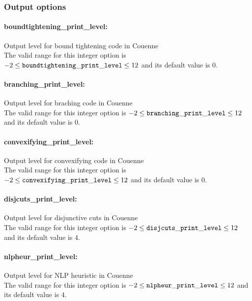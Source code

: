 \subsubsection{Output options}

\paragraph{boundtightening\_print\_level:}\label{sec:boundtightening_print_level} Output level for bound tightening code in Couenne $\;$ \\
 The valid range for this integer option is
$-2 \le {\tt boundtightening\_print\_level } \le 12$
and its default value is $0$.

\paragraph{branching\_print\_level:}\label{sec:branching_print_level} Output level for braching code in Couenne $\;$ \\
 The valid range for this integer option is
$-2 \le {\tt branching\_print\_level } \le 12$
and its default value is $0$.

\paragraph{convexifying\_print\_level:}\label{sec:convexifying_print_level} Output level for convexifying code in Couenne $\;$ \\
 The valid range for this integer option is
$-2 \le {\tt convexifying\_print\_level } \le 12$
and its default value is $0$.

\paragraph{disjcuts\_print\_level:}\label{sec:disjcuts_print_level} Output level for disjunctive cuts in Couenne $\;$ \\
 The valid range for this integer option is
$-2 \le {\tt disjcuts\_print\_level } \le 12$
and its default value is $4$.

\paragraph{nlpheur\_print\_level:}\label{sec:nlpheur_print_level} Output level for NLP heuristic in Couenne $\;$ \\
 The valid range for this integer option is
$-2 \le {\tt nlpheur\_print\_level } \le 12$
and its default value is $4$.

